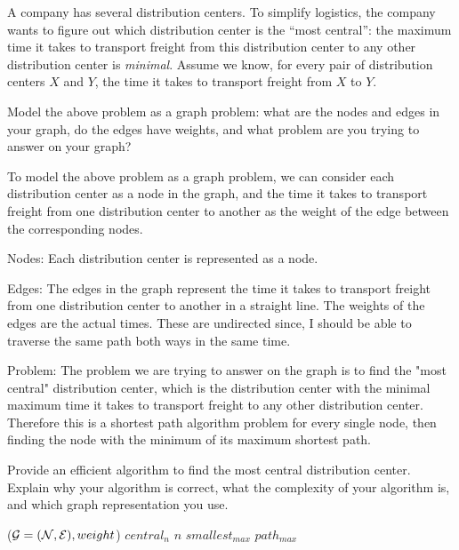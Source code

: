 \begin{problem}
A company has several distribution centers. To simplify logistics, the company wants to figure out which distribution center is the ``most central'': the maximum time it takes to transport freight from this distribution center to any other distribution center is \emph{minimal}. Assume we know, for every pair of distribution centers $X$ and $Y$, the time it takes to transport freight from $X$ to $Y$.
\begin{questions}
\item Model the above problem as a graph problem: what are the nodes and edges in your graph, do the edges have weights, and what problem are you trying to answer on your graph?

To model the above problem as a graph problem, we can consider each distribution center as a node in the graph, and the time it takes to transport freight from one distribution center to another as the weight of the edge between the corresponding nodes.

Nodes: Each distribution center is represented as a node.

Edges: The edges in the graph represent the time it takes to transport freight from one distribution center to another in a straight line. The weights of the edges are the actual times. These are undirected since, I should be able to traverse the same path both ways in the same time.

Problem: The problem we are trying to answer on the graph is to find the "most central" distribution center, which is the distribution center with the minimal maximum time it takes to transport freight to any other distribution center. Therefore this is a shortest path algorithm problem for every single node, then finding the node with the minimum of its maximum shortest path.

\item Provide an efficient algorithm to find the most central distribution center. Explain why your algorithm is correct, what the complexity of your algorithm is, and which graph representation you use.

\begin{myalgo}{($\mathcal{G} = (\mathcal{N}, \mathcal{E}), weight$)}
      \STATE $central_n$ \GETS $n$
      \STATE $smallest_{max}$ \GETS $path_{max}$
    \ENDIF
  \ENDFOR
\end{myalgo}



\end{questions}
\end{problem}

